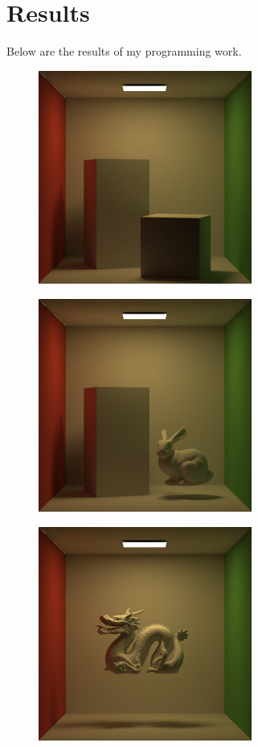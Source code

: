 \documentclass[acmtog]{acmart}
\begin{document}
\section{Results}
\qquad Below are the results of my programming work.
\begin{figure}[h]
	\centering
	\includegraphics[width=7cm,height=7cm]{output0.png}
\end{figure}
\begin{figure}[h]
	\centering
	\includegraphics[width=7cm,height=7cm]{output1.png}
\end{figure}
\begin{figure}[h]
	\centering
	\includegraphics[width=7cm,height=7cm]{output2.png}
\end{figure}
\end{document}

